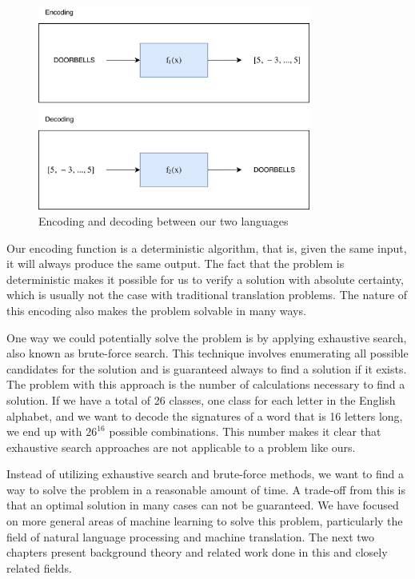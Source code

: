 \begin{figure}[ht]
    \centering
    \includegraphics[width=0.8\textwidth]{fig/background_theory/translation_illustrated.png}
    \caption{Encoding and decoding between our two languages}
    \label{fig:translation_illustration}
\end{figure}

Our encoding function is a deterministic algorithm, that is, given the same input, it will always produce the same output. The fact that the problem is deterministic makes it possible for us to verify a solution with absolute certainty, which is usually not the case with traditional translation problems. The nature of this encoding also makes the problem solvable in many ways. 

One way we could potentially solve the problem is by applying exhaustive search, also known as brute-force search. This technique involves enumerating all possible candidates for the solution and is guaranteed always to find a solution if it exists. The problem with this approach is the number of calculations necessary to find a solution. If we have a total of 26 classes, one class for each letter in the English alphabet, and we want to decode the signatures of a word that is 16 letters long, we end up with \(26^{16}\) possible combinations. This number makes it clear that exhaustive search approaches are not applicable to a problem like ours.

Instead of utilizing exhaustive search and brute-force methods, we want to find a way to solve the problem in a reasonable amount of time. A trade-off from this is that an optimal solution in many cases can not be guaranteed. We have focused on more general areas of machine learning to solve this problem, particularly the field of natural language processing and machine translation. The next two chapters present background theory and related work done in this and closely related fields.
